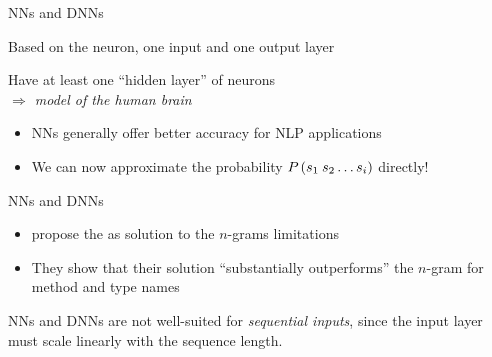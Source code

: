 \begin{frame}{\aclp{NN} and \aclp{DNN}}
    \begin{description}
        \setlength{\itemsep}{1.05ex}

        \item[\acfp{NN}:]

        Based on the neuron, one input and one output layer

        \item[\acfp{DNN}:]

        Have at least one \enquote{hidden layer} of neurons \\
        \emph{$\Longrightarrow$ model of the human brain}

    \end{description}

    \vspace*{\baselineskip}

    \begin{itemize}
        \setlength{\itemsep}{1.05ex}
        \item

        \acsp{NN} generally offer better accuracy for \acs{NLP} applications

        \item

        We can now approximate the probability $\P(s_1\:s_2 \ldots s_i)$ directly!
    \end{itemize}
\end{frame}

\begin{frame}{\aclp{NN} and \aclp{DNN}}
    \begin{itemize}
        \setlength{\itemsep}{1ex}
        \item

        \citeauthor*{Allamanis2015Suggesting} propose the   as solution
        to the $n$-grams limitations

        \item

        They show that their solution \enquote{substantially outperforms} the $n$-gram for
        method and type names~\cite{Allamanis2015Suggesting}

    \end{itemize}

    \pause %

    \vspace*{\baselineskip}

    \begin{m-problem}
        \acsp{NN} and \acsp{DNN} are not well-suited for \emph{sequential inputs}, since
        the input layer must scale linearly with the sequence length.
    \end{m-problem}
\end{frame}

